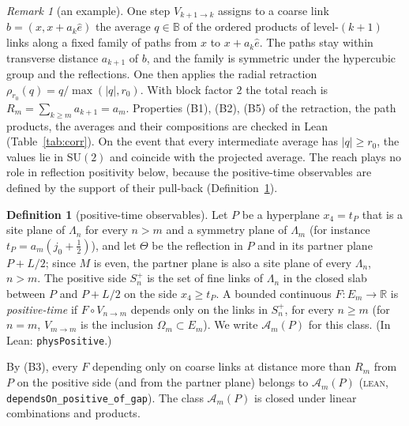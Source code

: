 \documentclass[11pt,a4paper]{article}
\theoremstyle{definition}
\newtheorem{definition}[theorem]{Definition}
\theoremstyle{remark}
\newtheorem{remark}[theorem]{Remark}
\newcommand{\B}{\mathbb{B}}
\newcommand{\ra}{\rho_{r_0}}
\newcommand{\tagL}{\textsc{lean}}
\newcommand{\lt}[1]{\texttt{#1}}
\begin{document}
\begin{remark}[an example]\label{rem:example}
One step $V_{k+1\to k}$ assigns to a coarse link $b=(x,x+a_k\hat e)$ the average $q\in\B$ of the ordered products of level-$(k+1)$ links along a fixed family of paths from $x$ to $x+a_k\hat e$. The paths stay within transverse distance $a_{k+1}$ of $b$, and the family is symmetric under the hypercubic group and the reflections. One then applies the radial retraction $\ra(q)=q/\max(|q|,r_0)$. With block factor $2$ the total reach is $R_m=\sum_{k\ge m}a_{k+1}=a_m$. Properties (B1), (B2), (B5) of the retraction, the path products, the averages and their compositions are checked in Lean (Table~\ref{tab:corr}). On the event that every intermediate average has $|q|\ge r_0$, the values lie in $\mathrm{SU}(2)$ and coincide with the projected average. The reach plays no role in reflection positivity below, because the positive-time observables are defined by the support of their pull-back (Definition~\ref{def:positive}).
\end{remark}

\begin{definition}[positive-time observables]\label{def:positive}
Let $P$ be a hyperplane $x_4=t_P$ that is a site plane of $\Lambda_n$ for every $n>m$ and a symmetry plane of $\Lambda_m$ (for instance $t_P=a_m(j_0+\tfrac12)$), and let $\Theta$ be the reflection in $P$ and in its partner plane $P+L/2$; since $M$ is even, the partner plane is also a site plane of every $\Lambda_n$, $n>m$. The positive side $S_n^+$ is the set of fine links of $\Lambda_n$ in the closed slab between $P$ and $P+L/2$ on the side $x_4\ge t_P$. A bounded continuous $F\colon E_m\to\mathbb R$ is \emph{positive-time} if $F\circ V_{n\to m}$ depends only on the links in $S_n^+$, for every $n\ge m$ (for $n=m$, $V_{m\to m}$ is the inclusion $\Omega_m\subset E_m$). We write $\mathcal A_m(P)$ for this class. (In Lean: \lt{physPositive}.)
\end{definition}

By (B3), every $F$ depending only on coarse links at distance more than $R_m$ from $P$ on the positive side (and from the partner plane) belongs to $\mathcal A_m(P)$ (\tagL, \lt{dependsOn\_\allowbreak{}positive\_\allowbreak{}of\_\allowbreak{}gap}). The class $\mathcal A_m(P)$ is closed under linear combinations and products.
\end{document}
